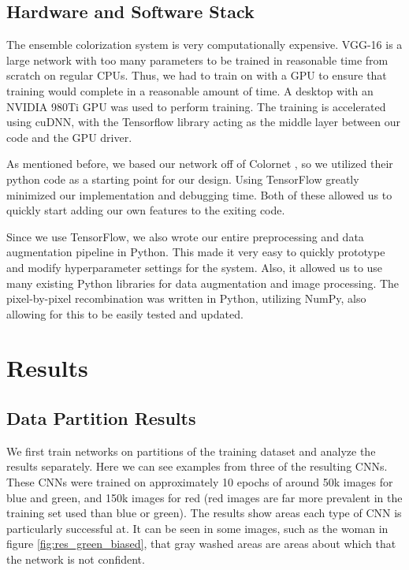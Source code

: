 \documentclass[10pt,twocolumn,letterpaper]{article}
\begin{document}
\subsection{Hardware and Software Stack}

The ensemble colorization system is very computationally expensive. VGG-16 is a large network with too many parameters to be trained in reasonable time from scratch on regular CPUs. Thus, we had to train on with a GPU to ensure that training would complete in a reasonable amount of time. A desktop with an NVIDIA 980Ti GPU was used to perform training. The training is accelerated using cuDNN, with the Tensorflow library acting as the middle layer between our code and the GPU driver.

As mentioned before, we based our network off of Colornet \cite{ColorNet}, so we utilized their python code as a starting point for our design. Using TensorFlow greatly minimized our implementation and debugging time. Both of these allowed us to quickly start adding our own features to the exiting code.

Since we use TensorFlow, we also wrote our entire preprocessing and data augmentation pipeline in Python. This made it very easy to quickly prototype and modify hyperparameter settings for the system. Also, it allowed us to use many existing Python libraries for data augmentation and image processing. The pixel-by-pixel recombination was written in Python, utilizing NumPy, also allowing for this to be easily tested and updated.

\section{Results}

\subsection{Data Partition Results}

We first train networks on partitions of the training dataset and analyze the results separately. Here we can see examples from three of the resulting CNNs. These CNNs were trained on approximately 10 epochs of around 50k images for blue and green, and 150k images for red (red images are far more prevalent in the training set used than blue or green). The results show areas each type of CNN is particularly successful at. It can be seen in some images, such as the woman in figure \ref{fig:res_green_biased}, that gray washed areas are areas about which that the network is not confident.
\end{document}

